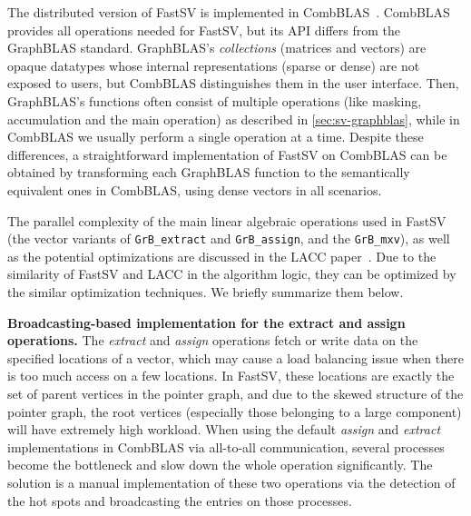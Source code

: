 \documentclass{sokendai_thesis} %
\begin{document}
The distributed version of FastSV is implemented in CombBLAS~\cite{combblas}.
CombBLAS provides all operations needed for FastSV, but its API differs from the GraphBLAS standard.
GraphBLAS's \textit{collections} (matrices and vectors) are opaque datatypes whose internal representations (sparse or dense) are not exposed to users, but CombBLAS distinguishes them in the user interface.
Then, GraphBLAS's functions often consist of multiple operations (like masking, accumulation and the main operation) as described in \autoref{sec:sv-graphblas}, while in CombBLAS we usually perform a single operation at a time.
Despite these differences, a straightforward implementation of FastSV on CombBLAS can be obtained by transforming each GraphBLAS function to the semantically equivalent ones in CombBLAS, using dense vectors in all scenarios.

The parallel complexity of the main linear algebraic operations used in FastSV (the vector variants of \texttt{GrB\_extract} and \texttt{GrB\_assign}, and the \texttt{GrB\_mxv}), as well as the potential optimizations are discussed in the LACC paper~\cite{lacc}.
Due to the similarity of FastSV and LACC in the algorithm logic, they can be optimized by the similar optimization techniques.
We briefly summarize them below.

\textbf{Broadcasting-based implementation for the extract and assign operations.}
The \emph{extract} and \emph{assign} operations fetch or write data on the specified locations of a vector, which may cause a load balancing issue when there is too much access on a few locations.
In FastSV, these locations are exactly the set of parent vertices in the pointer graph, and due to the skewed structure of the pointer graph, the root vertices (especially those belonging to a large component) will have extremely high workload.
When using the default \emph{assign} and \emph{extract} implementations in CombBLAS via all-to-all communication, several processes become the bottleneck and slow down the whole operation significantly.
The solution is a manual implementation of these two operations via the detection of the hot spots and broadcasting the entries on those processes.
\end{document}
